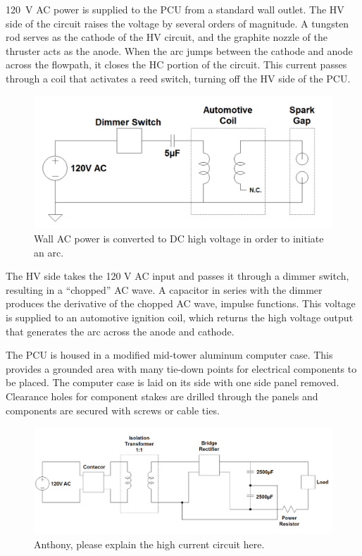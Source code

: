 \documentclass[journal]{IEEEtran}
\begin{document}
\SI{120}{\volt} AC power is supplied to the PCU from a standard wall outlet.
The HV side of the circuit raises the voltage by several orders of magnitude.
A tungsten rod serves as the cathode of the HV circuit, and the graphite nozzle of the thruster acts as the anode.  When the arc jumps between the cathode and anode across the flowpath, it closes the HC portion of the circuit.
This current passes through a coil that activates a reed switch, turning off the HV side of the PCU.\@

\begin{figure}[htp]
  \includegraphics[width=\linewidth]{figs/hv-schematic.png}
  \caption{Wall AC power is converted to DC high voltage in order to initiate an arc.
\label{fig:hv-circuit}
}
\end{figure}

The HV side takes the 120 V AC input and passes it through a dimmer switch, resulting in a ``chopped'' AC wave.
A capacitor in series with the dimmer produces the derivative of the chopped AC wave, impulse functions.
This voltage is supplied to an automotive ignition coil, which returns the high voltage output that generates the arc across the anode and cathode.

{\color{red}
  The PCU is housed in a modified mid-tower aluminum computer case.
  This provides a grounded area with many tie-down points for electrical components to be placed.
  The computer case is laid on its side with one side panel removed.
  Clearance holes for component stakes are drilled through the panels and components are secured with screws or cable ties.
}

\begin{figure}[htp]
  \includegraphics[width=\linewidth]{figs/hc-schematic.png}
  \caption{{\color{red}Anthony, please explain the high current circuit here.}
\label{fig:hc-circuit}
}
\end{figure}
\end{document}
